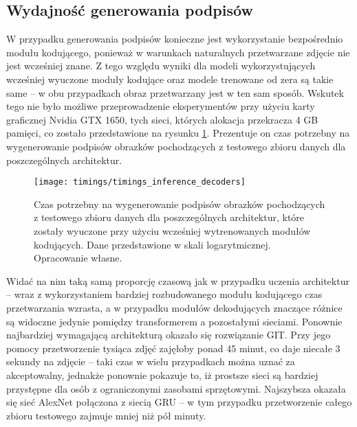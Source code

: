 \subsection{Wydajność generowania podpisów}
W przypadku generowania podpisów konieczne jest wykorzystanie bezpośrednio modułu kodującego, ponieważ w warunkach naturalnych przetwarzane zdjęcie nie jest wcześniej znane. Z tego względu wyniki dla modeli wykorzystujących wcześniej wyuczone moduły kodujące oraz modele trenowane od zera są takie same -- w obu przypadkach obraz przetwarzany jest w ten sam sposób. Wskutek tego nie było możliwe przeprowadzenie eksperymentów przy użyciu karty graficznej Nvidia GTX 1650, tych sieci, których alokacja przekracza 4 GB pamięci, co zostało przedstawione na rysunku \ref{fig:timings-decoders-inference}. Prezentuje on czas potrzebny na wygenerowanie podpisów obrazków pochodzących z testowego zbioru danych dla poszczególnych architektur.
\begin{figure}[H]
    \centering
    \texttt{[image: timings/timings\_inference\_decoders]}
    \caption{Czas potrzebny na wygenerowanie podpisów obrazków pochodzących z testowego zbioru danych dla poszczególnych architektur, które zostały wyuczone przy użyciu wcześniej wytrenowanych modułów kodujących. Dane przedstawione w skali logarytmicznej. Opracowanie własne.}
    \label{fig:timings-decoders-inference}
\end{figure}
\noindent Widać na nim taką samą proporcję czasową jak w przypadku uczenia architektur -- wraz z wykorzystaniem bardziej rozbudowanego modułu kodującego czas przetwarzania wzrasta, a w przypadku modułów dekodujących znaczące różnice są widoczne jedynie pomiędzy transformerem a pozostałymi sieciami. Ponownie najbardziej wymagającą architekturą okazało się rozwiązanie GIT. Przy jego pomocy przetworzenie tysiąca zdjęć zajęłoby ponad 45 minut, co daje niecałe 3 sekundy na zdjęcie -- taki czas w wielu przypadkach można uznać za akceptowalny, jednakże ponownie pokazuje to, iż prostsze sieci są bardziej przystępne dla osób z ograniczonymi zasobami sprzętowymi. Najszybsza okazała się sieć AlexNet połączona z siecią GRU -- w tym przypadku przetworzenie całego zbioru testowego zajmuje mniej niż pół minuty.

